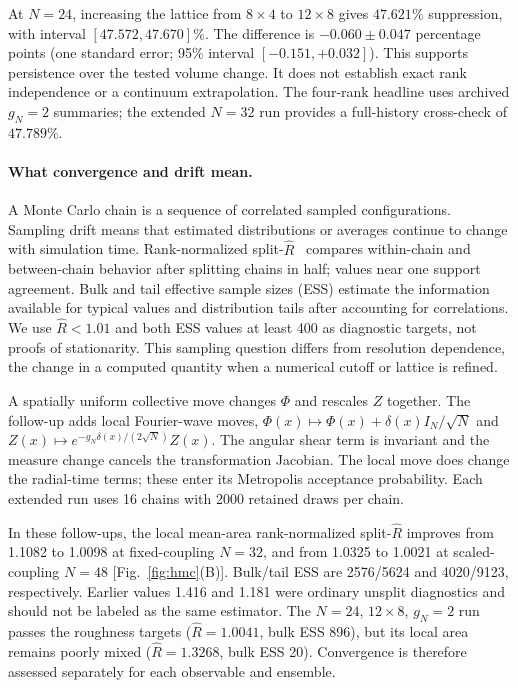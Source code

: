 \documentclass[onecolumn,11pt,aps,prd,amsmath,amssymb,nofootinbib,floatfix]{revtex4-2}
\begin{document}
At $N=24$, increasing the lattice from $8\times4$ to $12\times8$ gives $47.621\%$ suppression, with interval $[47.572,47.670]\%$. The difference is $-0.060\pm0.047$ percentage points (one standard error; 95\% interval $[-0.151,+0.032]$). This supports persistence over the tested volume change. It does not establish exact rank independence or a continuum extrapolation. The four-rank headline uses archived $g_N=2$ summaries; the extended $N=32$ run provides a full-history cross-check of $47.789\%$.

\paragraph{What convergence and drift mean.}
A Monte Carlo chain is a sequence of correlated sampled configurations. Sampling drift means that estimated distributions or averages continue to change with simulation time. Rank-normalized split-$\hat R$~\cite{Vehtari2021} compares within-chain and between-chain behavior after splitting chains in half; values near one support agreement. Bulk and tail effective sample sizes (ESS) estimate the information available for typical values and distribution tails after accounting for correlations. We use $\hat R<1.01$ and both ESS values at least 400 as diagnostic targets, not proofs of stationarity. This sampling question differs from resolution dependence, the change in a computed quantity when a numerical cutoff or lattice is refined.

A spatially uniform collective move changes $\Phi$ and rescales $Z$ together. The follow-up adds local Fourier-wave moves,
$\Phi(x)\mapsto\Phi(x)+\delta(x)I_N/\sqrt N$ and $Z(x)\mapsto e^{-g_N\delta(x)/(2\sqrt N)}Z(x)$.
The angular shear term is invariant and the measure change cancels the transformation Jacobian. The local move does change the radial-time terms; these enter its Metropolis acceptance probability. Each extended run uses 16 chains with 2000 retained draws per chain.

In these follow-ups, the local mean-area rank-normalized split-$\hat R$ improves from 1.1082 to 1.0098 at fixed-coupling $N=32$, and from 1.0325 to 1.0021 at scaled-coupling $N=48$ [Fig.~\ref{fig:hmc}(B)]. Bulk/tail ESS are 2576/5624 and 4020/9123, respectively. Earlier values 1.416 and 1.181 were ordinary unsplit diagnostics and should not be labeled as the same estimator. The $N=24$, $12\times8$, $g_N=2$ run passes the roughness targets ($\hat R=1.0041$, bulk ESS 896), but its local area remains poorly mixed ($\hat R=1.3268$, bulk ESS 20). Convergence is therefore assessed separately for each observable and ensemble.
\end{document}
